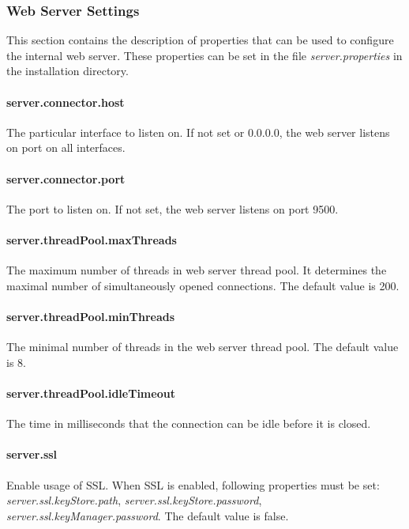 \subsubsection{Web Server Settings}
\label{sssec:WebServerSettings}
This section contains the description of properties that can be used to
configure the internal web server. These properties can be set in the file
\emph{server.properties} in the installation directory.

\paragraph{server.connector.host}
The particular interface to listen on. If not set or 0.0.0.0, the web server
listens on port on all interfaces.

\paragraph{server.connector.port}
The port to listen on. If not set, the web server listens on port 9500.

\paragraph{server.threadPool.maxThreads}
The maximum number of threads in web server thread pool. It determines the
maximal number of simultaneously opened connections. The default value is 200.

\paragraph{server.threadPool.minThreads}
The minimal number of threads in the web server thread pool. The default value
is 8.

\paragraph{server.threadPool.idleTimeout}
The time in milliseconds that the connection can be idle before it is closed.

\paragraph{server.ssl}
Enable usage of SSL. When SSL is enabled, following properties must be set:
\emph{server.ssl.keyStore.path}, \emph{server.ssl.keyStore.password}, \emph{server.ssl.keyManager.password}. The default value is false.

